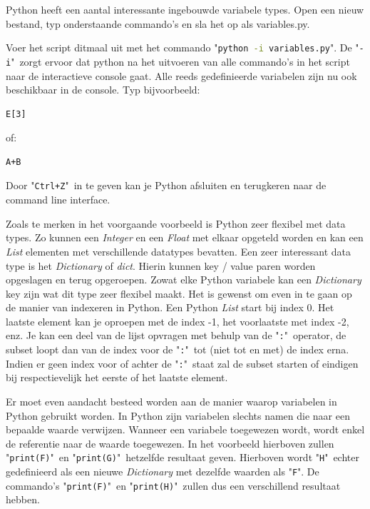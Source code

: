 \documentclass[11pt,twoside]{article}
\begin{document}
Python heeft een aantal interessante ingebouwde variabele types. Open een nieuw bestand, typ onderstaande commando's en sla het op als \textsf{variables.py}.


Voer het script ditmaal uit met het commando "\lstinline[language=bash]{python -i variables.py}". De "\lstinline[language=bash]{-i}"\ zorgt ervoor dat python na het uitvoeren van alle commando's in het script naar de interactieve console gaat. Alle reeds gedefinieerde variabelen zijn nu ook beschikbaar in de console. Typ bijvoorbeeld:
\begin{lstlisting}
E[3]
\end{lstlisting}
of:
\begin{lstlisting}
A+B
\end{lstlisting}
Door "\lstinline{Ctrl+Z}"\ in te geven kan je Python afsluiten en terugkeren naar de command line interface.

Zoals te merken in het voorgaande voorbeeld is Python zeer flexibel met data types. Zo kunnen een \emph{Integer} en een \emph{Float} met elkaar opgeteld worden en kan een \emph{List} elementen met verschillende datatypes bevatten. Een zeer interessant data type is het \emph{Dictionary} of \emph{dict}. Hierin kunnen key / value paren worden opgeslagen en terug opgeroepen. Zowat elke Python variabele kan een \emph{Dictionary} key zijn wat dit type zeer flexibel maakt. Het is gewenst om even in te gaan op de manier van indexeren in Python. Een Python \emph{List} start bij index 0. Het laatste element kan je oproepen met de index -1, het voorlaatste met index -2, enz. Je kan een deel van de lijst opvragen met behulp van de "\lstinline{:}"\ operator, de subset loopt dan van de index voor de "\lstinline{:}"\ tot (niet tot en met) de index erna. Indien er geen index voor of achter de "\lstinline{:}"\ staat zal de subset starten of eindigen bij respectievelijk het eerste of het laatste element.

Er moet even aandacht besteed worden aan de manier waarop variabelen in Python gebruikt worden. In Python zijn variabelen slechts namen die naar een bepaalde waarde verwijzen. Wanneer een variabele toegewezen wordt, wordt enkel de referentie naar de waarde toegewezen. In het voorbeeld hierboven zullen "\lstinline{print(F)}"\ en "\lstinline{print(G)}"\ hetzelfde resultaat geven. Hierboven wordt "\lstinline{H}"\ echter gedefinieerd als een nieuwe \emph{Dictionary} met dezelfde waarden als "\lstinline{F}". De commando's "\lstinline{print(F)}"\ en "\lstinline{print(H)}"\ zullen dus een verschillend resultaat hebben.
\end{document}
